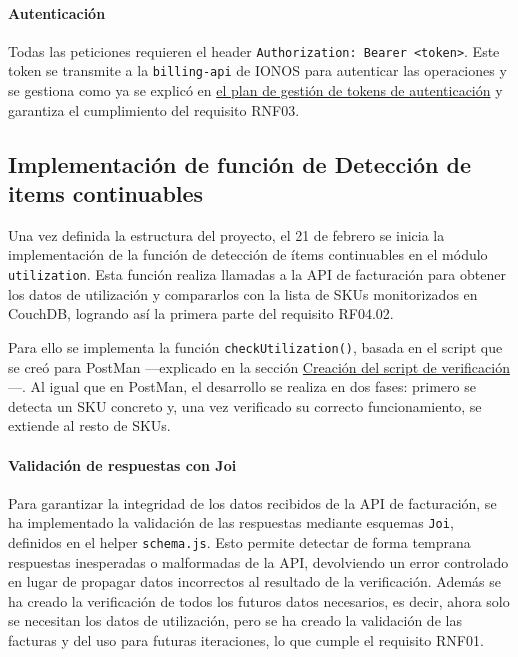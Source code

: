 \paragraph{Autenticación }
Todas las peticiones requieren el header \texttt{Authorization: Bearer <token>}. Este token se
transmite a la \texttt{billing-api} de IONOS para autenticar las operaciones y se gestiona como ya se explicó en
\hyperref[iteraciones:gestion-tokens]{el plan de gestión de tokens de autenticación} y garantiza el cumplimiento del requisito RNF03.

\subsection{Implementación de función de Detección de items continuables}
Una vez definida la estructura del proyecto, el 21 de febrero se inicia la implementación de la función de detección de ítems continuables en el módulo \texttt{utilization}. Esta función realiza llamadas a la API de facturación para obtener los datos de utilización y compararlos con la lista de SKUs monitorizados en CouchDB, logrando así la primera parte del requisito RF04.02.

Para ello se implementa la función \texttt{checkUtilization()}, basada en el script que se creó para PostMan ---explicado en la sección \hyperref[iteraciones:script-verificacion-postman]{Creación del script de verificación}---. Al igual que en PostMan, el desarrollo se realiza en dos fases: primero se detecta un SKU concreto y, una vez verificado su correcto funcionamiento, se extiende al resto de SKUs.

\paragraph{Validación de respuestas con Joi}

Para garantizar la integridad de los datos recibidos de la API de facturación, se ha implementado la validación de las respuestas mediante esquemas \texttt{Joi}, definidos en el helper \texttt{schema.js}. Esto permite detectar de forma temprana respuestas inesperadas o malformadas de la API, devolviendo un error controlado en lugar de propagar datos incorrectos al resultado de la verificación. Además se ha creado la verificación de todos los futuros datos necesarios, es decir, ahora solo se necesitan los datos de utilización, pero se ha creado la validación de las facturas y del uso para futuras iteraciones, lo que cumple el requisito RNF01.

